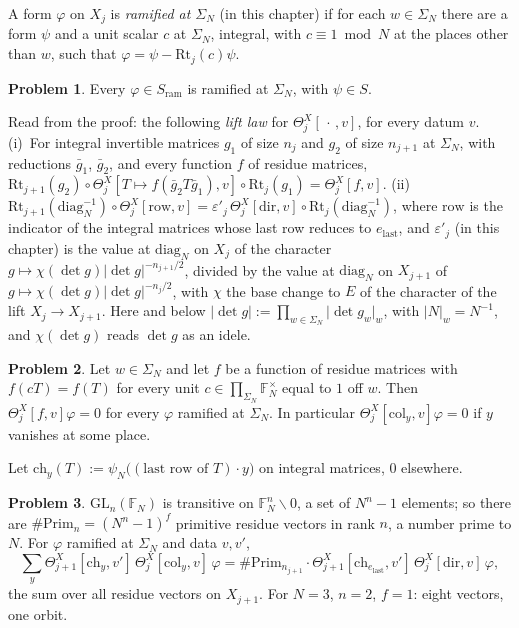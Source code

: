 \documentclass[reqno]{amsart}
\newcounter{chap}
\theoremstyle{plain}
\theoremstyle{definition}
\newtheorem{problem}{Problem}[section]
\theoremstyle{remark}
\newcommand{\F}{{\mathbb{F}}}
\newcommand{\ram}{\mathrm{ram}}
\newcommand{\Rt}{\mathrm{Rt}}
\newcommand{\dir}{\mathrm{dir}}
\newcommand{\col}{\mathrm{col}}
\newcommand{\ch}{\mathrm{ch}}
\newcommand{\Prim}{\mathrm{Prim}}
\newcommand{\dg}{\mathrm{diag}_N}
\newcommand{\elast}{e_{\mathrm{last}}}
\begin{document}
A form \(\varphi\) on \(X_j\) is \emph{ramified at \(\Sigma_N\)} (in this chapter) if for each \(w \in \Sigma_N\) there are a form \(\psi\) and a unit scalar \(c\) at \(\Sigma_N\), integral, with \(c \equiv 1 \bmod N\) at the places other than \(w\), such that \(\varphi = \psi - \Rt_j(c)\psi\).

\begin{problem}\label{pr:ram-vector}
Every \(\varphi \in S_\ram\) is ramified at \(\Sigma_N\), with \(\psi \in S\).
\end{problem}

Read from the proof: the following \emph{lift law} for \(\Theta^X_j[\,\cdot\,, v]\), for every datum \(v\).  (i)~For integral invertible matrices \(g_1\) of size \(n_j\) and \(g_2\) of size \(n_{j+1}\) at \(\Sigma_N\), with reductions \(\bar g_1\), \(\bar g_2\), and every function \(f\) of residue matrices, \(\Rt_{j+1}(g_2)\circ\Theta^X_j[T \mapsto f(\bar g_2T\bar g_1), v]\circ\Rt_j(g_1) = \Theta^X_j[f, v]\).  (ii)~\(\Rt_{j+1}(\dg^{-1})\circ\Theta^X_j[\mathrm{row}, v] = \varepsilon'_j\,\Theta^X_j[\dir, v]\circ\Rt_j(\dg^{-1})\), where \(\mathrm{row}\) is the indicator of the integral matrices whose last row reduces to \(\elast\), and \(\varepsilon'_j\) (in this chapter) is the value at \(\dg\) on \(X_j\) of the character \(g \mapsto \chi(\det g)\lvert\det g\rvert^{-n_{j+1}/2}\), divided by the value at \(\dg\) on \(X_{j+1}\) of \(g \mapsto \chi(\det g)\lvert\det g\rvert^{-n_j/2}\), with \(\chi\) the base change to \(E\) of the character of the lift \(X_j \to X_{j+1}\).  Here and below \(\lvert\det g\rvert := \prod_{w \in \Sigma_N}\lvert\det g_w\rvert_w\), with \(\lvert N\rvert_w = N^{-1}\), and \(\chi(\det g)\) reads \(\det g\) as an idele.

\begin{problem}\label{pr:non-primitive}
Let \(w \in \Sigma_N\) and let \(f\) be a function of residue matrices with \(f(cT) = f(T)\) for every unit \(c \in \prod_{\Sigma_N}\F_N^\times\) equal to \(1\) off \(w\).  Then \(\Theta^X_j[f, v]\varphi = 0\) for every \(\varphi\) ramified at \(\Sigma_N\).  In particular \(\Theta^X_j[\col_y, v]\varphi = 0\) if \(y\) vanishes at some place.
\end{problem}

Let \(\ch_y(T) := \psi_N\bigl((\text{last row of } T)\cdot y\bigr)\) on integral matrices, \(0\) elsewhere.

\begin{problem}\label{pr:primitive}
\(\mathrm{GL}_n(\F_N)\) is transitive on \(\F_N^n \smallsetminus 0\), a set of \(N^n - 1\) elements; so there are \(\#\Prim_n = (N^n-1)^f\) primitive residue vectors in rank \(n\), a number prime to \(N\).  For \(\varphi\) ramified at \(\Sigma_N\) and data \(v, v'\),
\[
  \sum_y \Theta^X_{j+1}[\ch_y, v']\,\Theta^X_j[\col_y, v]\,\varphi = \#\Prim_{n_{j+1}}\cdot\Theta^X_{j+1}[\ch_{\elast}, v']\,\Theta^X_j[\dir, v]\,\varphi ,
\]
the sum over all residue vectors on \(X_{j+1}\).  For \(N = 3\), \(n = 2\), \(f = 1\): eight vectors, one orbit.
\end{problem}
\end{document}
